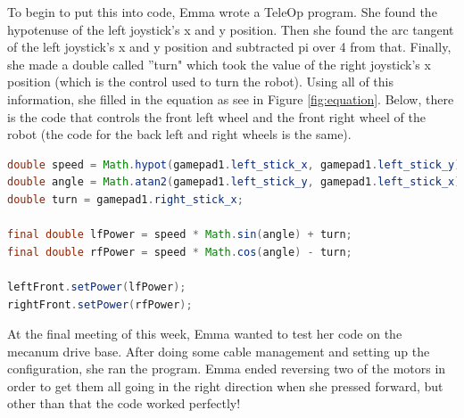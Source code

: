 \documentclass{article}
\begin{document}
To begin to put this into code, Emma wrote a TeleOp program. She found the hypotenuse of the left joystick's x and y position. Then she found the arc tangent of the left joystick's x and y position and subtracted pi over 4 from that. Finally, she made a double called ''turn" which took the value of the right joystick's x position (which is the control used to turn the robot). Using all of this information, she filled in the equation as see in Figure \ref{fig:equation}. Below, there is the code that controls the front left wheel and the front right wheel of the robot (the code for the back left and right wheels is the same). \\

\newpage
\begin{lstlisting}[language=Java]
double speed = Math.hypot(gamepad1.left_stick_x, gamepad1.left_stick_y);
double angle = Math.atan2(gamepad1.left_stick_y, gamepad1.left_stick_x);
double turn = gamepad1.right_stick_x;

final double lfPower = speed * Math.sin(angle) + turn;
final double rfPower = speed * Math.cos(angle) - turn;

leftFront.setPower(lfPower);
rightFront.setPower(rfPower);
\end{lstlisting}

At the final meeting of this week, Emma wanted to test her code on the mecanum drive base. After doing some cable management and setting up the configuration, she ran the program. Emma ended reversing two of the motors in order to get them all going in the right direction when she pressed forward, but other than that the code worked perfectly! \\
\end{document}

